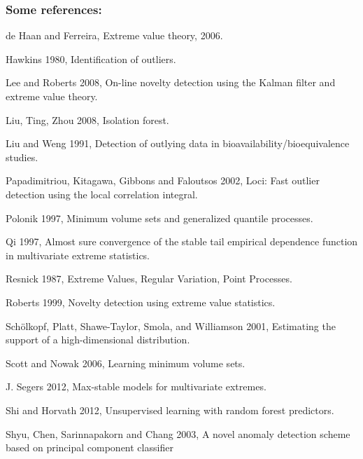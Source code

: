 \documentclass[9pt]{beamer}
\begin{document}
\begin{frame}
\frametitle{Some references:}
\begin{itemize}
\footnotesize{
\item de Haan and Ferreira, Extreme value theory, 2006.

\item Hawkins 1980, Identification of outliers.

\item Lee and Roberts 2008, On-line novelty detection using the Kalman filter and extreme value theory.

\item Liu, Ting, Zhou 2008, Isolation forest.

\item Liu and Weng 1991,  Detection of outlying data in bioavailability/bioequivalence studies. 

\item Papadimitriou, Kitagawa, Gibbons and Faloutsos 2002, Loci: Fast outlier detection using the local correlation integral.

\item Polonik 1997, Minimum volume sets and generalized quantile processes.

\item Qi 1997, Almost sure convergence of the stable tail empirical dependence function in multivariate extreme statistics.

\item Resnick 1987, Extreme Values, Regular Variation, Point Processes.

\item Roberts 1999, Novelty detection using extreme value statistics.

\item Sch{\"o}lkopf, Platt, Shawe-Taylor, Smola, and Williamson 2001, Estimating the support of a high-dimensional distribution.

\item Scott and Nowak 2006, Learning minimum volume sets.

\item J. Segers 2012, Max-stable models for multivariate extremes.

\item Shi and Horvath 2012, Unsupervised learning with random forest predictors.

\item Shyu, Chen, Sarinnapakorn and Chang 2003, A novel anomaly detection scheme based on principal component classifier

}
\end{itemize}
\end{frame}
\end{document}
